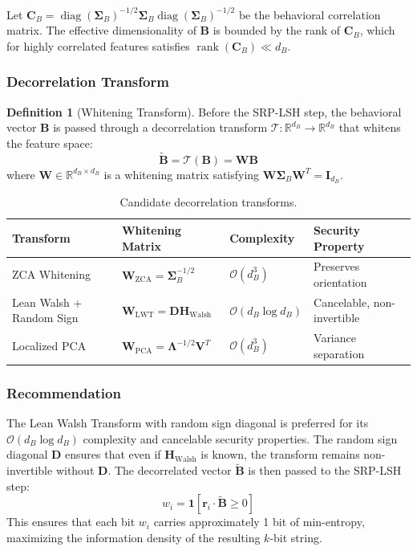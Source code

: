 \documentclass[11pt,twoside]{amsart}
\theoremstyle{plain}
\theoremstyle{definition}
\newtheorem{definition}[theorem]{Definition}
\theoremstyle{remark}
\DeclareMathOperator{\rank}{rank}
\DeclareMathOperator{\diag}{diag}
\newcommand{\indicator}{\mathbf{1}}
\newcommand{\bB}{\mathbf{B}}
\newcommand{\br}{\mathbf{r}}
\newcommand{\bSigma}{\boldsymbol{\Sigma}}
\newcommand{\bbR}{\mathbb{R}}
\newcommand{\indicator}{\mathbbm{1}}
\begin{document}
Let $\mathbf{C}_B = \diag(\bSigma_B)^{-1/2} \bSigma_B \diag(\bSigma_B)^{-1/2}$ be the behavioral correlation matrix. The effective dimensionality of $\bB$ is bounded by the rank of $\mathbf{C}_B$, which for highly correlated features satisfies $\rank(\mathbf{C}_B) \ll d_B$.

\subsubsection{Decorrelation Transform}

\begin{definition}[Whitening Transform]
\label{def:whitening}
Before the SRP-LSH step, the behavioral vector $\bB$ is passed through a decorrelation transform $\mathcal{T}: \bbR^{d_B} \rightarrow \bbR^{d_B}$ that whitens the feature space:
\begin{equation}
\tilde{\bB} = \mathcal{T}(\bB) = \mathbf{W} \bB
\end{equation}
where $\mathbf{W} \in \bbR^{d_B \times d_B}$ is a whitening matrix satisfying $\mathbf{W} \bSigma_B \mathbf{W}^T = \mathbf{I}_{d_B}$.
\end{definition}

\begin{table}[htbp]
\centering
\caption{Candidate decorrelation transforms.}
\label{tab:decorrelation}
\begin{tabular}{@{}p{3.5cm}p{4cm}p{2cm}p{3.5cm}@{}}
\toprule
\textbf{Transform} & \textbf{Whitening Matrix} & \textbf{Complexity} & \textbf{Security Property} \\
\midrule
ZCA Whitening & $\mathbf{W}_{\text{ZCA}} = \bSigma_B^{-1/2}$ & $\mathcal{O}(d_B^3)$ & Preserves orientation \\
Lean Walsh + Random Sign & $\mathbf{W}_{\text{LWT}} = \mathbf{D} \mathbf{H}_{\text{Walsh}}$ & $\mathcal{O}(d_B \log d_B)$ & Cancelable, non-invertible \\
Localized PCA & $\mathbf{W}_{\text{PCA}} = \boldsymbol{\Lambda}^{-1/2} \mathbf{V}^T$ & $\mathcal{O}(d_B^3)$ & Variance separation \\
\bottomrule
\end{tabular}
\end{table}

\subsubsection{Recommendation}

The Lean Walsh Transform with random sign diagonal is preferred for its $\mathcal{O}(d_B \log d_B)$ complexity and cancelable security properties. The random sign diagonal $\mathbf{D}$ ensures that even if $\mathbf{H}_{\text{Walsh}}$ is known, the transform remains non-invertible without $\mathbf{D}$. The decorrelated vector $\tilde{\bB}$ is then passed to the SRP-LSH step:
\begin{equation}
w_i = \indicator[\br_i \cdot \tilde{\bB} \geq 0]
\end{equation}
This ensures that each bit $w_i$ carries approximately 1 bit of min-entropy, maximizing the information density of the resulting $k$-bit string.
\end{document}
